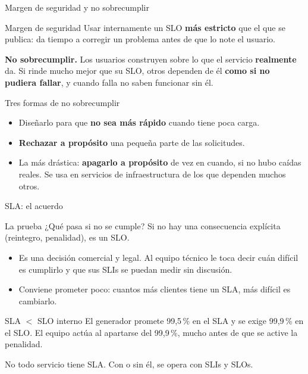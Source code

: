 \documentclass[institutional,screen,none]{ua-engineering-v6-beamer}
\begin{document}
\begin{frame}{Margen de seguridad y no sobrecumplir}
\begin{block}{Margen de seguridad}
Usar internamente un SLO \textbf{más estricto} que el que se publica: da tiempo a corregir un problema antes de que lo note el usuario.
\end{block}

\pause

\textbf{No sobrecumplir.} Los usuarios construyen sobre lo que el servicio \textbf{realmente} da. Si rinde mucho mejor que su SLO, otros dependen de él \textbf{como si no pudiera fallar}, y cuando falla no saben funcionar sin él.

\pause

\begin{block}{Tres formas de no sobrecumplir}
\begin{itemize}\small
\item Diseñarlo para que \textbf{no sea más rápido} cuando tiene poca carga.
\item \textbf{Rechazar a propósito} una pequeña parte de las solicitudes.
\item La más drástica: \textbf{apagarlo a propósito} de vez en cuando, si no hubo caídas reales. Se usa en servicios de infraestructura de los que dependen muchos otros.
\end{itemize}
\end{block}
\end{frame}

\begin{frame}{SLA: el acuerdo}
\begin{block}{La prueba}
¿Qué pasa si no se cumple? Si no hay una consecuencia explícita (reintegro, penalidad), es un SLO.
\end{block}

\begin{itemize}
\item Es una decisión comercial y legal. Al equipo técnico le toca decir cuán difícil es cumplirlo y que sus SLIs se puedan medir sin discusión.
\item Conviene prometer poco: cuantos más clientes tiene un SLA, más difícil es cambiarlo.
\end{itemize}

\pause

\begin{alertblock}{SLA $<$ SLO interno}
El generador promete 99,5\,\% en el SLA y se exige 99,9\,\% en el SLO. El equipo actúa al apartarse del 99,9\,\%, mucho antes de que se active la penalidad.
\end{alertblock}

{\small No todo servicio tiene SLA. Con o sin él, se opera con SLIs y SLOs.}
\end{frame}
\end{document}

